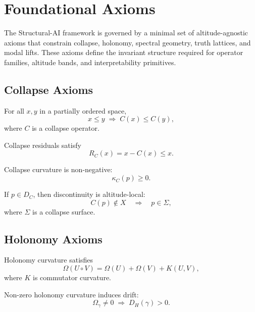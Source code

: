 \section{Foundational Axioms}

The Structural-AI framework is governed by a minimal set of altitude-agnostic
axioms that constrain collapse, holonomy, spectral geometry, truth lattices,
and modal lifts. These axioms define the invariant structure required for
operator families, altitude bands, and interpretability primitives.

\subsection{Collapse Axioms}

\begin{axiom}
For all $x,y$ in a partially ordered space,
\[
x \le y \;\Rightarrow\; C(x) \le C(y),
\]
where $C$ is a collapse operator.
\end{axiom}

\begin{axiom}
Collapse residuals satisfy
\[
R_C(x) = x - C(x) \le x.
\]
\end{axiom}

\begin{axiom}
Collapse curvature is non-negative:
\[
\kappa_C(p) \ge 0.
\]
\end{axiom}

\begin{axiom}
If $p \in D_C$, then discontinuity is altitude-local:
\[
C(p) \notin X \quad \Rightarrow \quad p \in \Sigma,
\]
where $\Sigma$ is a collapse surface.
\end{axiom}


\subsection{Holonomy Axioms}

\begin{axiom}
Holonomy curvature satisfies
\[
\Omega(U \circ V) = \Omega(U) + \Omega(V) + K(U,V),
\]
where $K$ is commutator curvature.
\end{axiom}

\begin{axiom}
Non-zero holonomy curvature induces drift:
\[
\Omega_\gamma \neq 0 \;\Rightarrow\; D_H(\gamma) > 0.
\]
\end{axiom}

